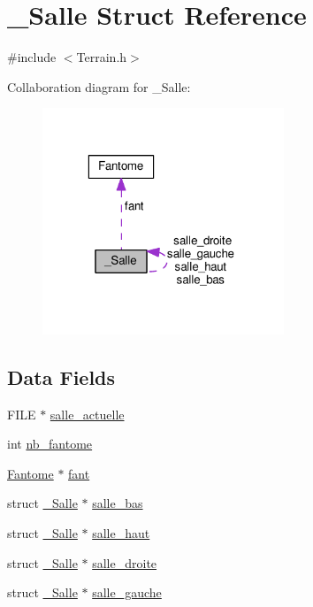 \hypertarget{struct___salle}{\section{\-\_\-\-Salle Struct Reference}
\label{struct___salle}
}


{\ttfamily \#include $<$Terrain.\-h$>$}



Collaboration diagram for \-\_\-\-Salle\-:\nopagebreak
\begin{figure}[H]
\begin{center}
\leavevmode
\includegraphics[width=205pt]{struct___salle__coll__graph}
\end{center}
\end{figure}
\subsection*{Data Fields}
\begin{DoxyCompactItemize}
\item 
F\-I\-L\-E $\ast$ \hyperlink{struct___salle_a9b2eab48569631cecdd9c2193f6c0200}{salle\-\_\-actuelle}
\item 
int \hyperlink{struct___salle_a47d84eea0555715068bf00a979b77b27}{nb\-\_\-fantome}
\item 
\hyperlink{struct_fantome}{Fantome} $\ast$ \hyperlink{struct___salle_a569b56072a5a66ebf7db5ab24d371550}{fant}
\item 
struct \hyperlink{struct___salle}{\-\_\-\-Salle} $\ast$ \hyperlink{struct___salle_aa68ee082aa9dcc1ea99c09f46c2b002d}{salle\-\_\-bas}
\item 
struct \hyperlink{struct___salle}{\-\_\-\-Salle} $\ast$ \hyperlink{struct___salle_af393d5336c949f3725154408969f9d32}{salle\-\_\-haut}
\item 
struct \hyperlink{struct___salle}{\-\_\-\-Salle} $\ast$ \hyperlink{struct___salle_abfc5cf6453be9701bad25e9b464e6a63}{salle\-\_\-droite}
\item 
struct \hyperlink{struct___salle}{\-\_\-\-Salle} $\ast$ \hyperlink{struct___salle_af01484c040a5ff15b3f5487acefa31f9}{salle\-\_\-gauche}
\end{DoxyCompactItemize}


